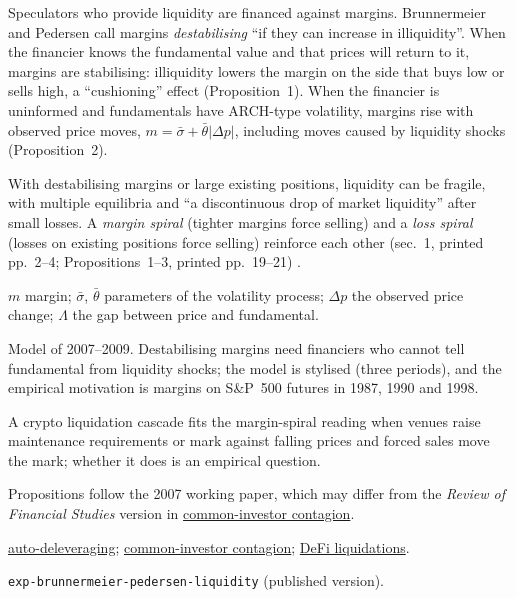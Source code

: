 \begin{qfmodel}\label{mod:liquidity-spirals}
 Speculators who provide liquidity are financed against margins. Brunnermeier and Pedersen call margins \emph{destabilising} ``if they can increase in illiquidity''. When the financier knows the fundamental value and that prices will return to it, margins are stabilising: illiquidity lowers the margin on the side that buys low or sells high, a ``cushioning'' effect (Proposition~1). When the financier is uninformed and fundamentals have ARCH-type volatility, margins rise with observed price moves, $m=\bar\sigma+\bar\theta|\Delta p|$, including moves caused by liquidity shocks (Proposition~2).

With destabilising margins or large existing positions, liquidity can be fragile, with multiple equilibria and ``a discontinuous drop of market liquidity'' after small losses. A \emph{margin spiral} (tighter margins force selling) and a \emph{loss spiral} (losses on existing positions force selling) reinforce each other (sec.~1, printed pp.~2--4; Propositions~1--3, printed pp.~19--21) \citep[NBER WP~12939, February 2007, sec.~1 and Propositions~1--3]{exp-brunnermeier-pedersen-liquidity}.

 $m$ margin; $\bar\sigma$, $\bar\theta$ parameters of the volatility process; $\Delta p$ the observed price change; $\Lambda$ the gap between price and fundamental.

 Model of 2007--2009. Destabilising margins need financiers who cannot tell fundamental from liquidity shocks; the model is stylised (three periods), and the empirical motivation is margins on S\&P~500 futures in 1987, 1990 and 1998.

 A crypto liquidation cascade fits the margin-spiral reading when venues raise maintenance requirements or mark against falling prices and forced sales move the mark; whether it does is an empirical question.

 Propositions follow the 2007 working paper, which may differ from the \emph{Review of Financial Studies} version in \hyperref[def:common-investor-contagion]{common-investor contagion}.

 \hyperref[mech:crypto-auto-deleveraging]{auto-deleveraging}; \hyperref[def:common-investor-contagion]{common-investor contagion}; \hyperref[mech:defi-lending-liquidation]{DeFi liquidations}.

 \nolinkurl{exp-brunnermeier-pedersen-liquidity} (published version).

\end{qfmodel}
